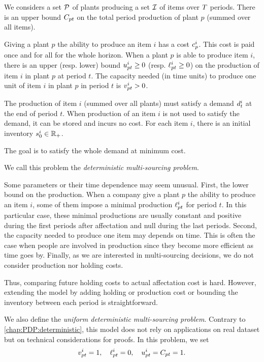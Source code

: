 \medskip


We considers a set $\mathcal{P}$ of plants producing a set $\mathcal{I}$ of items over $T$ periods.
There is an upper bound $C_{pt}$ on the total period production of plant $p$ (summed over all items).

Giving a plant $p$ the ability to produce an item $i$ has a cost $c_p^i$.
This cost is paid once and for all for the whole horizon.
When a plant $p$ is able to produce item $i$, there is an upper (resp. lower) bound $u_{pt}^i\ge 0$ (resp. $\ell_{pt}^i\ge 0$) on the production of item $i$ in plant $p$ at period $t$.
The capacity needed (in time units) to produce one unit of item $i$ in plant $p$ in period $t$ is $v_{pt}^i>0$.


The production of item $i$ (summed over all plants) must satisfy a demand $d_t^i$ at the end of period $t$.
When production of an item $i$ is not used to satisfy the demand, it can be stored and incurs no cost.
For each item $i$, there is an initial inventory $s_0^i\in\mathbb{R}_+$.


The goal is to satisfy the whole demand at minimum cost.


We call this problem the \emph{deterministic multi-sourcing problem}.


\medskip


Some parameters or their time dependence may seem unusual.
First, the lower bound on the production.
When a company give a plant $p$ the ability to produce an item $i$, some of them impose a minimal production $\ell_{pt}^i$ for period $t$.
In this particular case, these minimal productions are usually constant and positive during the first periods after affectation and null during the last periods.
Second, the capacity needed to produce one item may depends on time.
This is often the case when people are involved in production since they become more efficient as time goes by.
Finally, as we are interested in multi-sourcing decisions, we do not consider production nor holding costs.

Thus, comparing future holding costs to actual affectation cost is hard.
However, extending the model by adding holding or production cost or bounding the inventory between each period is straightforward.


\medskip


We also define the \emph{uniform deterministic multi-sourcing problem}. Contrary to \cref{chap:PDP:deterministic}, this model does not rely on applications on real dataset but on technical considerations for proofs. In this problem, we set
$$
v_{pt}^i = 1
,\quad
\ell_{pt}^i = 0
,\quad
u_{pt}^i = C_{pt} = 1
.
$$

